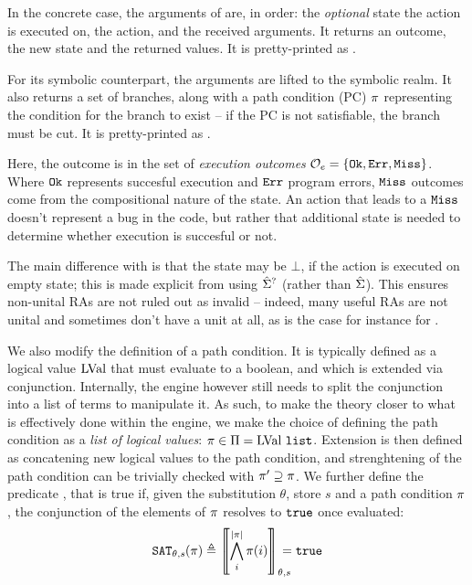 In the concrete case, the arguments of \execac{} are, in order: the \emph{optional} state the action is executed on, the action, and the received arguments. It returns an outcome, the new state and the returned values. It is pretty-printed as .

For its symbolic counterpart, the arguments are lifted to the symbolic realm. It also returns a set of branches, along with a path condition (PC) $\pi$ representing the condition for the branch to exist -- if the PC is not satisfiable, the branch must be cut. It is pretty-printed as .

Here, the outcome is in the set of \emph{execution outcomes} ${\cal O}_e=\{ \texttt{Ok},\texttt{Err},\texttt{Miss} \}$. Where $\texttt{Ok}$ represents succesful execution and $\texttt{Err}$ program errors, $\texttt{Miss}$ outcomes come from the compositional nature of the state. An action that leads to a $\texttt{Miss}$ doesn't represent a bug in the code, but rather that additional state is needed to determine whether execution is succesful or not.

The main difference with \cite{cse2} is that the state may be $\bot$, if the action is executed on empty state; this is made explicit from using $\hat{\Sigma}^?$ (rather than $\hat{\Sigma}$). This ensures non-unital RAs are not ruled out as invalid -- indeed, many useful RAs are not unital and sometimes don't have a unit at all, as is the case for instance for \Ex.

We also modify the definition of a path condition. It is typically defined as a logical value $\text{LVal}$ that must evaluate to a boolean, and which is extended via conjunction. Internally, the engine however still needs to split the conjunction into a list of terms to manipulate it. As such, to make the theory closer to what is effectively done within the engine, we make the choice of defining the path condition as a \emph{list of logical values}: $\pi\in\Pi=\text{LVal}~\texttt{list}$. Extension is then defined as concatening new logical values to the path condition, and strenghtening of the path condition can be trivially checked with $\pi'\supseteq\pi$. We further define the predicate , that is true if, given the substitution $\theta$, store $s$ and a path condition $\pi$, the conjunction of the elements of $\pi$ resolves to $\texttt{true}$ once evaluated:
\begin{align*}
	\texttt{SAT}_{\mathit{\theta,s}}(\pi) \triangleq \left\llbracket \bigwedge_{i}^{|\pi|}\pi(i) \right\rrbracket_{\theta,s} \hspace{-1em} = \texttt{true}
\end{align*}

